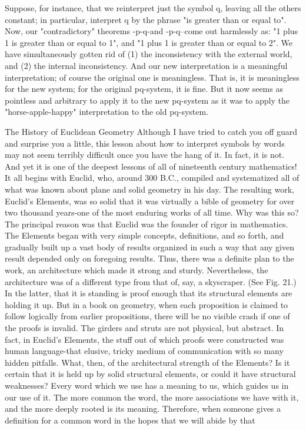 Suppose, for instance, that we reinterpret just the symbol q, leaving all the others constant; in particular, interpret q by the phrase "is greater than or equal to". Now, our "contradictory" theorems -p-q-and -p-q--come out harmlessly as: "1 plus 1 is greater than or equal to 1", and "1 plus 1 is greater than or equal to 2". We have simultaneously gotten rid of (1) the inconsistency with the external world, and (2) the internal inconsistency. And our new interpretation is a meaningful interpretation; of course the original one is meaningless. That is, it is meaningless for the new system; for the original pq-system, it is fine. But it now seems as pointless and arbitrary to apply it to the new pq-system as it was to apply the "horse-apple-happy" interpretation to the old pq-system. 

The History of Euclidean Geometry Although I have tried to catch you off guard and surprise you a little, this lesson about how to interpret symbols by words may not seem terribly difficult once you have the hang of it. In fact, it is not. And yet it is one of the deepest lessons of all of nineteenth century mathematics! It all begins with Euclid, who, around 300 B.C., compiled and systematized all of what was known about plane and solid geometry in his day. The resulting work, Euclid's Elements, was so solid that it was virtually a bible of geometry for over two thousand years-one of the most enduring works of all time. Why was this so? The principal reason was that Euclid was the founder of rigor in mathematics. The Elements began with very simple concepts, definitions, and so forth, and gradually built up a vast body of results organized in such a way that any given result depended only on foregoing results. Thus, there was a definite plan to the work, an architecture which made it strong and sturdy. Nevertheless, the architecture was of a different type from that of, say, a skyscraper. (See Fig. 21.) In the latter, that it is standing is proof enough that its structural elements are holding it up. But in a book on geometry, when each proposition is claimed to follow logically from earlier propositions, there will be no visible crash if one of the proofs is invalid. The girders and struts are not physical, but abstract. In fact, in Euclid's Elements, the stuff out of which proofs were constructed was human language-that elusive, tricky medium of communication with so many hidden pitfalls. What, then, of the architectural strength of the Elements? Is it certain that it is held up by solid structural elements, or could it have structural weaknesses? Every word which we use has a meaning to us, which guides us in our use of it. The more common the word, the more associations we have with it, and the more deeply rooted is its meaning. Therefore, when someone gives a definition for a common word in the hopes that we will abide by that 







